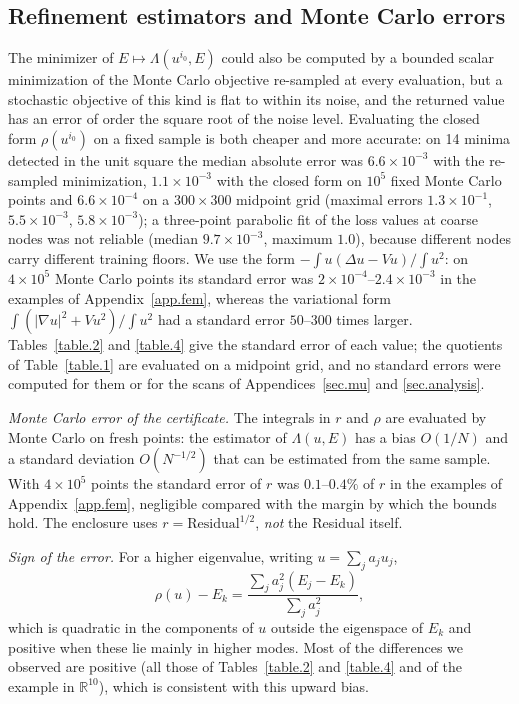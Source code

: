 \documentclass[10pt]{amsart}
\theoremstyle{definition}
\theoremstyle{remark}
\theoremstyle{plain}
\newcommand{\R}{\mathbb{R}}
\begin{document}
\subsection{Refinement estimators and Monte Carlo errors}\label{app.refine}
The minimizer of $E\mapsto\Lambda(u^{i_0},E)$ could also be computed by a bounded scalar minimization of
the Monte Carlo objective re-sampled at every evaluation, but a stochastic objective of this kind is
flat to within its noise, and the returned value has an error of order the square root of the noise
level. Evaluating the closed form $\rho(u^{i_0})$ on a fixed sample is both cheaper and more accurate: on
14 minima detected in the unit square the median absolute error was $6.6\times10^{-3}$ with the
re-sampled minimization, $1.1\times10^{-3}$ with the closed form on $10^5$ fixed Monte Carlo points and
$6.6\times10^{-4}$ on a $300\times300$ midpoint grid (maximal errors $1.3\times10^{-1}$, $5.5\times10^{-3}$,
$5.8\times10^{-3}$); a three-point parabolic fit of the loss values at coarse nodes was not reliable
(median $9.7\times10^{-3}$, maximum $1.0$), because different nodes carry different training floors. We use
the form $-\int u(\Delta u-Vu)/\int u^2$: on $4\times10^5$ Monte Carlo points its standard error was
$2\times10^{-4}$--$2.4\times10^{-3}$ in the examples of Appendix~\ref{app.fem}, whereas the variational
form $\int(|\nabla u|^2+Vu^2)/\int u^2$ had a standard error $50$--$300$ times larger.
Tables~\ref{table.2} and \ref{table.4} give the standard error of each value; the quotients of
Table~\ref{table.1} are evaluated on a midpoint grid, and no standard errors were computed for them or
for the scans of Appendices~\ref{sec.mu} and \ref{sec.analysis}.

\emph{Monte Carlo error of the certificate.} The integrals in $r$ and $\rho$ are evaluated by Monte Carlo
on fresh points: the estimator of $\Lambda(u,E)$ has a bias $O(1/N)$ and a standard deviation
$O(N^{-1/2})$ that can be estimated from the same sample. With $4\times10^5$ points the standard error of
$r$ was $0.1$--$0.4\%$ of $r$ in the examples of Appendix~\ref{app.fem}, negligible compared with the
margin by which the bounds hold. The enclosure uses $r=\mathrm{Residual}^{1/2}$, \emph{not} the
Residual itself.

\emph{Sign of the error.} For a higher eigenvalue, writing $u=\sum_ja_ju_j$,
\[
\rho(u)-E_k=\frac{\sum_ja_j^2(E_j-E_k)}{\sum_ja_j^2},
\]
which is quadratic in the components of $u$ outside the eigenspace of $E_k$ and positive when these lie
mainly in higher modes. Most of the differences we observed are positive (all those of
Tables~\ref{table.2} and \ref{table.4} and of the example in $\R^{10}$), which is consistent with this
upward bias.
\end{document}
